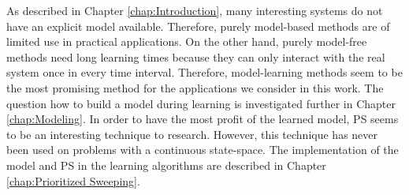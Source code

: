 
As described in Chapter \ref{chap:Introduction}, many interesting systems do not have an explicit model available. Therefore, purely model-based methods are of limited use in practical applications. On the other hand, purely model-free methods need long learning times because they can only interact with the real system once in every time interval. Therefore, model-learning methods seem to be the most promising method for the applications we consider in this work. The question how to build a model during learning is investigated further in Chapter \ref{chap:Modeling}. In order to have the most profit of the learned model, \ac{PS} seems to be an interesting technique to research. However, this technique has never been used on problems with a continuous state-space. The implementation of the model and \ac{PS} in the learning algorithms are described in Chapter \ref{chap:Prioritized Sweeping}.


